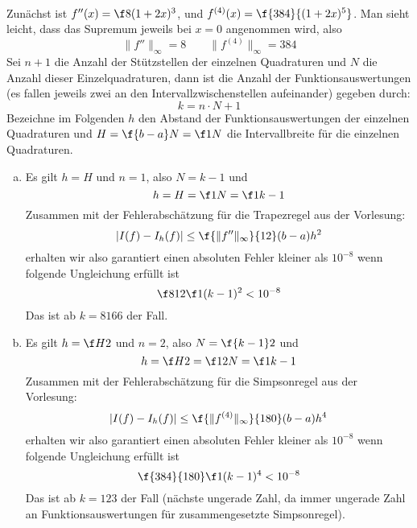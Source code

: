 \documentclass[a4paper]{scrartcl}
\begin{document}
\setcounter{aufgabe}{1}
\begin{aufgabe}~

	Zunächst ist $f''(x) = \f 8{(1+2x)^3}$, und $f^{(4)}(x) = \f {384}{(1+2x)^5}$.
	Man sieht leicht, dass das Supremum jeweils bei $x=0$ angenommen wird, also
	\[
		\|f''\|_\infty = 8
		\qquad
		\|f^{(4)}\|_\infty = 384
	\]
	Sei $n+1$ die Anzahl der Stützstellen der einzelnen Quadraturen und $N$ die Anzahl dieser Einzelquadraturen, dann ist die Anzahl der Funktionsauswertungen (es fallen jeweils zwei an den Intervallzwischenstellen aufeinander) gegeben durch:
	\[
		k = n \cdot N + 1
	\]
	Bezeichne im Folgenden $h$ den Abstand der Funktionsauswertungen der einzelnen Quadraturen und $H=\f{b-a}N = \f 1N$ die Intervallbreite für die einzelnen Quadraturen.
	\begin{enumerate}[a)]
		\item
			Es gilt $h = H$ und $n=1$, also $N=k-1$ und
			\[
				h = H = \f 1N = \f 1{k-1}
			\]
			Zusammen mit der Fehlerabschätzung für die Trapezregel aus der Vorlesung:
			\[
				|I(f) - I_h(f)| \le \f {\|f''\|_\infty}{12} (b-a)h^2
			\]
			erhalten wir also garantiert einen absoluten Fehler kleiner als $10^{-8}$ wenn folgende Ungleichung erfüllt ist
			\[
				\f 8{12} \f 1{(k-1)^2} < 10^{-8}
			\]
			Das ist ab $k=8166$ der Fall.
		\item
			Es gilt $h = \f H2$ und $n=2$, also $N= \f{k-1}2$ und
			\[
				h = \f H2 = \f 1{2N} = \f 1{k-1}
			\]
			Zusammen mit der Fehlerabschätzung für die Simpsonregel aus der Vorlesung:
			\[
				|I(f) - I_h(f)| \le \f {\|f^{(4)}\|_\infty}{180} (b-a)h^4
			\]
			erhalten wir also garantiert einen absoluten Fehler kleiner als $10^{-8}$ wenn folgende Ungleichung erfüllt ist
			\[
				\f {384}{180}\f 1{(k-1)^4} < 10^{-8}
			\]
			Das ist ab $k=123$ der Fall (nächste ungerade Zahl, da immer ungerade Zahl an Funktionsauswertungen für zusammengesetzte Simpsonregel).
	\end{enumerate}

\end{aufgabe}
\end{document}
